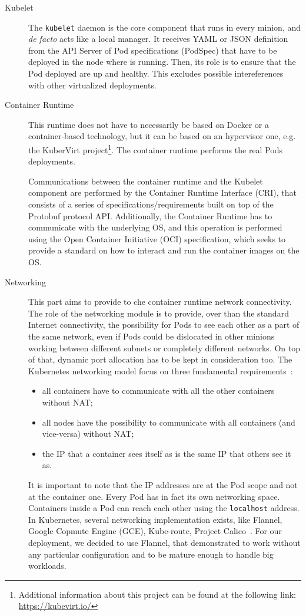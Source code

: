 \begin{description}
\item[Kubelet] The \verb!kubelet! daemon is the core component that runs in
  every minion, and \emph{de facto} acts like a local manager. It receives YAML
  or JSON definition from the API Server of Pod specifications (PodSpec) that
  have to be deployed in the node where is running. Then, its role is to ensure
  that the Pod deployed are up and healthy. This excludes possible
  intereferences with other virtualized deployments.
\item[Container Runtime] This runtime does not have to necessarily be based on
  Docker or a container-based technology, but it can be based on an hypervisor
  one, e.g. the KuberVirt project\footnote{Additional information about this
    project can be found at the following link: \url{https://kubevirt.io/}}. The
  container runtime performs the real Pods deployments.

  Communications between the container runtime and the Kubelet component are
  performed by the Container Runtime Interface (CRI), that consists of a series
  of specifications/requirements built on top of the Protobuf protocol API.
  Additionally, the Container Runtime has to communicate with the underlying OS,
  and this operation is performed using the Open Container Initiative (OCI)
  specification, which seeks to provide a standard on how to interact and run
  the container images on the OS.
\item[Networking] This part aims to provide to che container runtime network
  connectivity. The role of the networking module is to provide, over than the
  standard Internet connectivity, the possibility for Pods to see each other as
  a part of the same network, even if Pods could be dislocated in other minions
  working between different subnets or completely different networks. On top of
  that, dynamic port allocation has to be kept in consideration too. The
  Kubernetes networking model focus on three fundamental
  requirements~\cite{k8snetworkingwiki}:
  \begin{itemize}
  \item all containers have to communicate with all the other containers without
    NAT;
  \item all nodes have the possibility to communicate with all containers (and
    vice-versa) without NAT;
  \item the IP that a container sees itself as is the same IP that others see it
    as.
  \end{itemize}
  It is important to note that the IP addresses are at the Pod scope and not at
  the container one. Every Pod has in fact its own networking space. Containers
  inside a Pod can reach each other using the \verb!localhost! address. In
  Kubernetes, several networking implementation exists, like Flannel, Google
  Copmute Engine (GCE), Kube-route, Project Calico~\cite{k8snetworkingwiki}. For
  our deployment, we decided to use Flannel, that demonstrated to work without
  any particular configuration and to be mature enough to handle big workloads.


\end{description}
